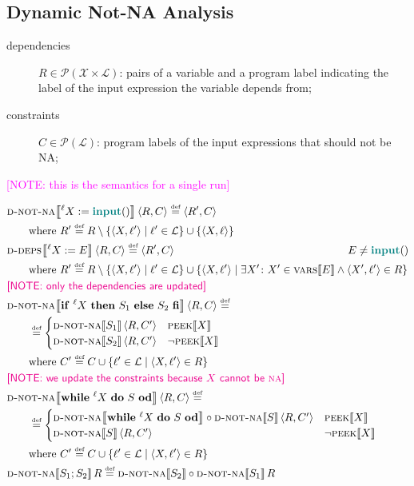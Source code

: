 \documentclass{article}
\newcommand{\defined}{\ensuremath{\stackrel{\mbox{\tiny def}}{=}}\xspace} %
\newcommand{\vars}{\ensuremath{\mathcal{X}}\xspace} %
\newcommand{\ipt}{\ensuremath{\mathsf{\mathbf{\color{teal}input}}()}\xspace} %
\newcommand{\powerset}[1]{\ensuremath{\mathcal{P}\left(#1\right)}\xspace} %
\newcommand{\tuple}[2]{\ensuremath{\langle #1, #2 \rangle}\xspace} %
\newcommand{\labels}{\ensuremath{\mathcal{L}}\xspace} %
\newcommand{\semantics}[1]{\ensuremath{\left\llbracket #1 \right\rrbracket}\xspace} %
\newcommand{\ddeps}[1]{\ensuremath{\textsc{d-deps}\!\semantics{#1}}\xspace} %
\newcommand{\ids}[1]{\ensuremath{\textsc{vars}\!\semantics{#1}}\xspace} %
\newcommand{\peek}[1]{\ensuremath{\textsc{peek}\!\semantics{#1}}\xspace} %
\newcommand{\dnna}[1]{\ensuremath{\textsc{d-not-na}\!\semantics{#1}}\xspace} %
\newcommand{\irem}[3]{{\noindent\textcolor{#1}{\textsf{[#2: 
#3]}}}}
\newcommand{\note}[1]{\irem{magenta}{NOTE}{#1}}
\begin{document}
\subsection*{Dynamic Not-NA Analysis}


\begin{description}
\item[dependencies] $R \in \powerset{\vars \times \labels}$: pairs of a variable and a program label indicating the label of the input expression the variable depends from;
\item[constraints] $C \in \powerset{\labels}$: program labels of the input expressions that should not be NA; 
\end{description}

\note{this is the semantics for a single run}

	\begin{align*}
	&\dnna{^\ell{}X := \ipt}\tuple{R}{C} \defined \tuple{R'}{C} \\
	&\qquad\mbox{where } R' \defined R \setminus \{ \tuple{X}{\ell{}'} \mid \ell{}' \in \labels \} \cup \{ \tuple{X}{\ell{}} \} 
	\\
	&\ddeps{^\ell{}X := E}\tuple{R}{C} \defined \tuple{R'}{C} \qquad\qquad\qquad\qquad\qquad\qquad\qquad\qquad E \not= \ipt\\
	&\qquad\mbox{where } R' \defined R \setminus \{ \tuple{X}{\ell{}'} \mid \ell{}' \in \labels \} \cup \{ \tuple{X}{\ell{}'} \mid \exists X'\colon X' \in \ids{E} \land \tuple{X'}{\ell{}'} \in R \} \\
%
	&\note{only the dependencies are updated} \\
%
	&\dnna{\mathsf{\mathbf{if}}~^\ell{}X~\mathsf{\mathbf{then}}~S_1~\mathsf{\mathbf{else}}~S_2~\mathsf{\mathbf{fi}}}\tuple{R}{C} \defined \\
	 &\qquad\defined  \begin{cases} \dnna{S_1}\tuple{R}{C'} & \peek{X} \\
	  \dnna{S_2}\tuple{R}{C'} & \neg \peek{X} \end{cases} \\ 
	  &\qquad\mbox{where } C' \defined C \cup \{\ell{}' \in \labels \mid \tuple{X}{\ell{}'} \in R \} \\ 
	  &\note{we update the constraints because $X$ cannot be \textsc{na}} \\
%
&\dnna{\mathsf{\mathbf{while}}~^\ell{}X~\mathsf{\mathbf{do}}~S~\mathsf{\mathbf{od}}} \tuple{R}{C}
\defined \\
&\qquad\defined \begin{cases} \dnna{\mathsf{\mathbf{while}}~^\ell{}X~\mathsf{\mathbf{do}}~S~\mathsf{\mathbf{od}}} \circ \dnna{S}\tuple{R}{C'} & \peek{X} \\
	  \dnna{S}\tuple{R}{C'} & \neg \peek{X} \end{cases} \\ 
	  &\qquad\mbox{where } C' \defined C \cup \{\ell{}' \in \labels \mid \tuple{X}{\ell{}'} \in R \} \\ 
%
&\dnna{S_1; S_2}R \defined \dnna{S_2} \circ 
\dnna{S_1}R
	\end{align*}
\end{document}

